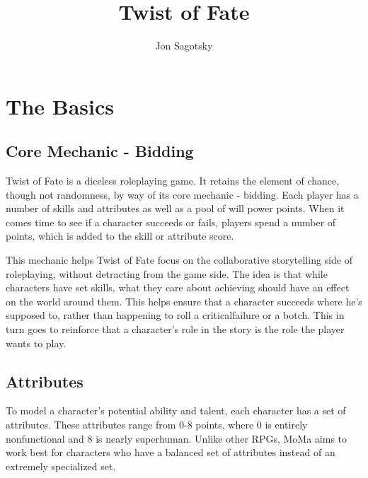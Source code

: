 \documentclass[twocolumn]{report}
\title{Twist of Fate}
\author{Jon Sagotsky}
\begin{document}
\maketitle
\tableofcontents

\chapter{The Basics}
\section{Core Mechanic - Bidding}

Twist of Fate is a diceless roleplaying game.  It retains the element of chance, though not randomness, by way of its core mechanic - bidding.  Each player has a number of skills and attributes as well as a pool of will power points.  When it comes	time to see if a character succeeds or fails, players spend a number of points, which is added to the skill or attribute score. 

This mechanic helps Twist of Fate focus on the collaborative storytelling side of roleplaying, without detracting from the game side.  The idea is that while characters have set skills, what they care about achieving should have an effect on the world around them.  This helps ensure that a character succeeds where he's supposed to, rather than happening to roll a criticalfailure or a botch.  This in turn goes to reinforce that a character's role in the story is the role the player wants to play.

\newpage
\section{Attributes}
To model a character's potential ability and talent, each character has a set of attributes.  These attributes range from 0-8 points, where 0 is entirely nonfunctional and 8 is nearly superhuman.  Unlike other RPGs, MoMa aims to work best for characters who have a balanced set of attributes instead of an extremely specialized set.
\end{document}
